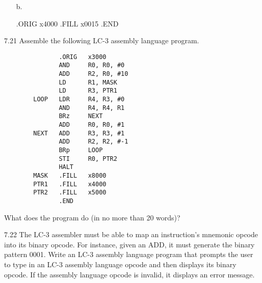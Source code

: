 \documentclass{patt}
\begin{document}
\begin{exercises}
\begin{enumerate}[a.]
\bigskip

\item[b.]
\begin{colorverbatim}
             .ORIG  x4000
             .FILL  x0015
             .END
\end{colorverbatim}
\end{enumerate}

\item[7.21] Assemble the following LC-3 assembly language program.

\begin{lstlisting}
               .ORIG   x3000
               AND     R0, R0, #0
               ADD     R2, R0, #10
               LD      R1, MASK
               LD      R3, PTR1
        LOOP   LDR     R4, R3, #0
               AND     R4, R4, R1
               BRz     NEXT
               ADD     R0, R0, #1
        NEXT   ADD     R3, R3, #1
               ADD     R2, R2, #-1
               BRp     LOOP
               STI     R0, PTR2
               HALT
        MASK   .FILL   x8000
        PTR1   .FILL   x4000
        PTR2   .FILL   x5000
               .END
\end{lstlisting}

  What does the program do (in no more than 20 words)?

\item[7.22] The LC-3 assembler must be able to map an instruction's
  mnemonic opcode into its binary opcode.  For instance, given an ADD,
  it must generate the binary pattern 0001.  Write an LC-3 assembly
  language program that prompts the user to type in an LC-3 assembly
  language opcode and then displays its binary opcode.  If the
  assembly language opcode is invalid, it displays an error message.



\end{exercises}
\end{document}
